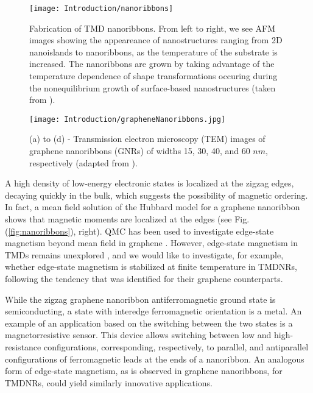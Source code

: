 \begin{figure}[H]
\centering
\texttt{[image: Introduction/nanoribbons]}
\caption[Fabrication of \ac{TMD} nanoribbons]{Fabrication of \ac{TMD} nanoribbons. From left to right, we see \ac{AFM} images showing the appeareance of nanostructures ranging from \ac{2D} nanoislands to nanoribbons, as the temperature of the substrate is increased. The nanoribbons are grown by taking advantage of the temperature dependence of shape transformations occuring during the nonequilibrium growth of surface-based nanostructures (taken from \cite{chen_fabrication_2017}).}
\label{fig:fabrication}
\end{figure}

\begin{figure}[H]
\vspace{-0.5cm}
\centering
\texttt{[image: Introduction/grapheneNanoribbons.jpg]}
\caption[(TEM) images of graphene nanoribbons.]{(a) to (d) - Transmission electron microscopy (TEM) images of graphene nanoribbons (GNRs) of widths 15, 30, 40, and 60 $nm$, respectively (adapted from \cite{mohanty_nanotomy-based_2012}).}
\label{fig:graphNano}
\end{figure}
   
A high density of low-energy electronic states is localized at the zigzag edges, decaying quickly in the bulk, which suggests the possibility of magnetic ordering.
In fact, a mean field solution of the Hubbard model for a graphene nanoribbon shows that magnetic moments are localized at the edges \cite{yazyev_emergence_2010} (see Fig.(\ref{fig:nanoribbons}), right).
QMC has been used to investigate edge-state magnetism beyond mean field in graphene \cite{feldner_dynamical_2011, golor_quantum_2013, cheng_strain-induced_2015, raczkowski_interplay_2017, yang_strain-tuning_2017}.
However, edge-state magnetism in \acp{TMD} remains unexplored \cite{davelou_nanoribbon_2017}, and we would like to investigate, for example, whether edge-state magnetism is stabilized at finite temperature in \acp{TMDNR}, following the tendency that was identified for their graphene counterparts.

While the zigzag graphene nanoribbon antiferromagnetic ground state is semiconducting, a state with interedge ferromagnetic orientation is a metal.
An example of an application based on the switching between the two states is a magnetorresistive sensor.
This device allows switching between low and high-resistance configurations, corresponding, respectively, to parallel, and antiparallel configurations of ferromagnetic leads at the ends of a nanoribbon.
An analogous form of edge-state magnetism, as is observed in graphene nanoribbons, for \acp{TMDNR}, could yield similarly innovative applications.

